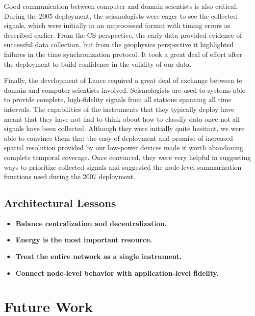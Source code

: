 \begin{itemize}
Good communication between computer and domain scientists is also critical.
During the 2005 deployment, the seismologists were eager to see the collected
signals, which were initially in an unprocessed format with timing errors as
described earlier. From the CS perspective, the early data provided evidence
of successful data collection, but from the geophysics perspective it
highlighted failures in the time synchronization protocol. It took a great
deal of effort after the deployment to build confidence in the validity of
our data.

Finally, the development of Lance required a great deal of exchange between
te domain and computer scientists involved. Seismologists are used to systems
able to provide complete, high-fidelity signals from all stations spanning
all time intervals. The capabilities of the instruments that they typically
deploy have meant that they have not had to think about how to classify data
once not all signals have been collected. Although they were initially quite
hesitant, we were able to convince them that the easy of deployment and
promise of increased spatial resolution provided by our low-power devices
made it worth abandoning complete temporal coverage. Once convinced, they
were very helpful in suggesting ways to prioritize collected signals and
suggested the node-level summarization functions used during the 2007
deployment.

\end{itemize}

\subsection{Architectural Lessons}

\begin{itemize}

\item \textbf{Balance centralization and decentralization.}

\item \textbf{Energy is the most important resource.}

\item \textbf{Treat the entire network as a single instrument.}

\item \textbf{Connect node-level behavior with application-level fidelity.}

\end{itemize}

\section{Future Work}

